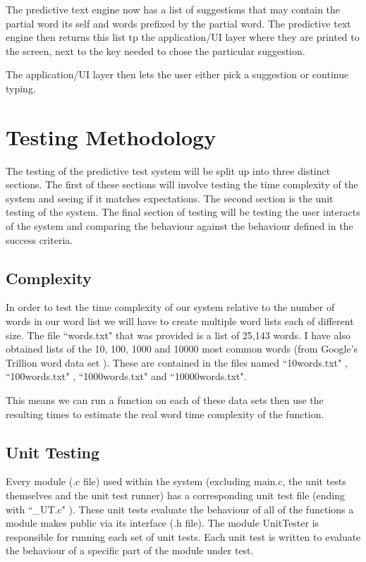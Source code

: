 \documentclass[10pt]{article} %
\begin{document}
            The predictive text engine now has a list of suggestions that may contain the partial word its self and words prefixed by the partial word. The predictive text engine then returns this list tp the application/UI layer where they are printed to the screen, next to the key needed to chose the particular suggestion.
            
            The application/UI layer then lets the user either pick a suggestion or continue typing.
            
    
	\section{Testing Methodology}
	
	    The testing of the predictive test system will be split up into three distinct sections. The first of these sections will involve testing the time complexity of the system and seeing if it matches expectations. The second section is the unit testing of the system. The final section of testing will be testing the user interacts of the system and comparing the behaviour against the behaviour defined in the success criteria.
		\subsection{Complexity}
		    In order to test the time complexity of our system relative to the number of words in our word list we will have to create multiple word lists each of different size. The file ``words.txt" that was provided is a list of 25,143 words. I have also obtained lists of the 10, 100, 1000 and 10000 most common words (from Google's Trillion word data set \cite{github:wordlist:first20hours} ). These are contained in the files named ``10words.txt" , ``100words.txt" , ``1000words.txt" and ``10000words.txt".
		    
		    This means we can run a function on each of these data sets then use the resulting times to estimate the real word time complexity of the function.				

				
		\subsection{Unit Testing}
		    Every module (.c file) used within the system (excluding main.c, the unit tests themselves and the unit test runner) has a corresponding unit test file (ending with ``\_UT.c" ). These unit tests evaluate the behaviour of all of the functions a module makes public via its interface (.h file). The module UnitTester is responsible for running each set of unit tests. Each unit test is written to evaluate the behaviour of a specific part of the module under test.
		    
\end{document}
